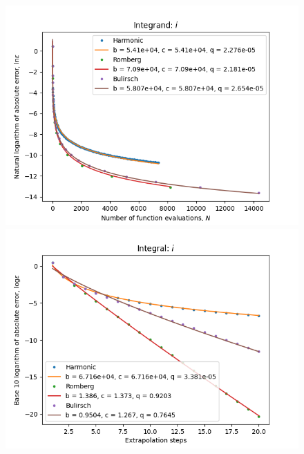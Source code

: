 \begin{figure}[H]
\centering
\begin{minipage}{0.45\textwidth}
\centering
\includegraphics[scale=0.45]{../results/romberg_plots/circle_area_hp_trend.png}
\end{minipage}
\begin{minipage}{0.45\textwidth}
\centering
\includegraphics[scale=0.45]{../results/romberg_plots/circle_area_hp_steps.png}
\end{minipage}
\end{figure}

